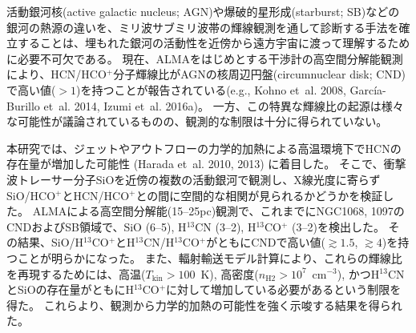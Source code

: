 \documentclass[ja]{2019b}
\begin{document}
活動銀河核(active galactic nucleus; AGN)や爆破的星形成(starburst; SB)などの銀河の熱源の違いを、ミリ波サブミリ波帯の輝線観測を通して診断する手法を確立することは、埋もれた銀河の活動性を近傍から遠方宇宙に渡って理解するために必要不可欠である。
現在、ALMAをはじめとする干渉計の高空間分解能観測により、HCN/HCO$^{+}$分子輝線比がAGNの核周辺円盤(circumnuclear disk; CND)で高い値($>1$)を持つことが報告されている(e.g., Kohno et~al. 2008, Garc\'{i}a-Burillo et~al. 2014, Izumi et~al. 2016a)。
一方、この特異な輝線比の起源は様々な可能性が議論されているものの、観測的な制限は十分に得られていない。

本研究では、ジェットやアウトフローの力学的加熱による高温環境下でHCNの存在量が増加した可能性 (Harada et~al. 2010, 2013) に着目した。
そこで、衝撃波トレーサー分子SiOを近傍の複数の活動銀河で観測し、X線光度に寄らずSiO/HCO$^{+}$とHCN/HCO$^{+}$との間に空間的な相関が見られるかどうかを検証した。
ALMAによる高空間分解能(15--25pc)観測で、これまでにNGC1068, 1097のCNDおよびSB領域で、SiO (6--5), H$^{13}$CN (3--2), H$^{13}$CO$^{+}$ (3--2)を検出した。
その結果、SiO/H$^{13}$CO$^{+}$とH$^{13}$CN/H$^{13}$CO$^{+}$がともにCNDで高い値($\gtrsim1.5$, $\gtrsim4$)を持つことが明らかになった。
また、輻射輸送モデル計算により、これらの輝線比を再現するためには、高温($T_{\mathrm{kin}}>100$~K), 高密度($n_{\mathrm{H2}}>10^{7}$~cm$^{-3}$), かつH$^{13}$CNとSiOの存在量がともにH$^{13}$CO$^{+}$に対して増加している必要があるという制限を得た。
これらより、観測から力学的加熱の可能性を強く示唆する結果を得られた。
\end{document}
